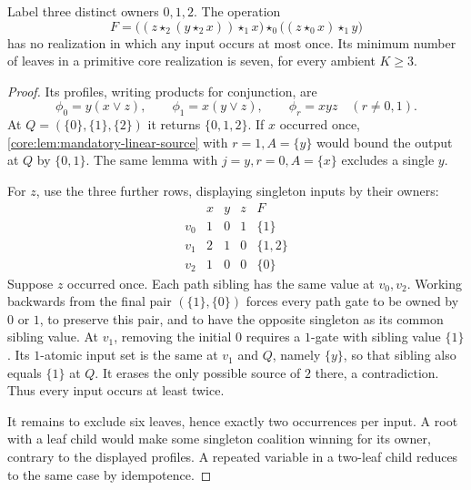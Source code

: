 \begin{proposition}
\label{core:prop:seven-leaf-branching}
Label three distinct owners $0,1,2$. The operation
\[
 F=\bigl((z\star_2(y\star_2x))\star_1x\bigr)
       \star_0\bigl((z\star_0x)\star_1y\bigr)
\]
has no realization in which any input occurs at most once.
Its minimum number of leaves in a primitive core realization is seven,
for every ambient $K\geq3$.
\end{proposition}
\begin{proof}
Its profiles, writing products for conjunction, are
\[
 \phi_0=y(x\vee z),\qquad \phi_1=x(y\vee z),\qquad
 \phi_r=xyz\quad(r\ne0,1).
\]
At $Q=(\{0\},\{1\},\{2\})$ it returns $\{0,1,2\}$.
If $x$ occurred once, \cref{core:lem:mandatory-linear-source} with
$r=1,A=\{y\}$ would bound the output at $Q$ by $\{0,1\}$.
The same lemma with $j=y,r=0,A=\{x\}$ excludes a single $y$.

For $z$, use the three further rows, displaying singleton inputs by
their owners:
\[
\begin{array}{c|ccc|c}
 &x&y&z&F\\\hline
 v_0&1&0&1&\{1\}\\
 v_1&2&1&0&\{1,2\}\\
 v_2&1&0&0&\{0\}
\end{array}
\]
Suppose $z$ occurred once. Each path sibling has the same value at
$v_0,v_2$. Working backwards from the final pair $(\{1\},\{0\})$
forces every path gate to be owned by $0$ or $1$, to preserve this
pair, and to have the opposite singleton as its common sibling value.
At $v_1$, removing the initial $0$ requires a $1$-gate with sibling
value $\{1\}$. Its $1$-atomic input set is the same at $v_1$ and
$Q$, namely $\{y\}$, so that sibling also equals $\{1\}$ at $Q$.
It erases the only possible source of $2$ there, a contradiction.
Thus every input occurs at least twice.

It remains to exclude six leaves, hence exactly two occurrences per
input. A root with a leaf child would make some singleton coalition
winning for its owner, contrary to the displayed profiles. A repeated
variable in a two-leaf child reduces to the same case by idempotence.


\end{proof}
